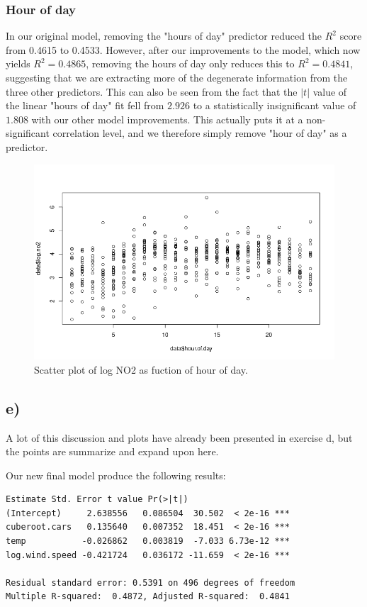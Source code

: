 \documentclass[a4paper, twocolumn]{article}
\begin{document}
\subsubsection*{Hour of day}
In our original model, removing the "hours of day" predictor reduced the $R^2$ score from 0.4615 to 0.4533. However, after our improvements to the model, which now yields $R^2 = 0.4865$, removing the hours of day only reduces this to $R^2 = 0.4841$, suggesting that we are extracting more of the degenerate information from the three other predictors. This can also be seen from the fact that the $|t|$ value of the linear "hours of day" fit fell from $2.926$ to a statistically insignificant value of $1.808$ with our other model improvements. This actually puts it at a non-significant correlation level, and we therefore simply remove "hour of day" as a predictor.


\begin{figure}[h!]
    \centering
    \includegraphics[width=0.7\linewidth]{figures/no2_hour_vs_no2.png}
    \caption{Scatter plot of log NO2 as fuction of hour of day.}
    \label{fig:no2_hour_vs_no2}
\end{figure}


\subsection*{e)}
A lot of this discussion and plots have already been presented in exercise d, but the points are summarize and expand upon here.

Our new final model produce the following results:
\begin{Verbatim}[fontsize=\small]
    Estimate Std. Error t value Pr(>|t|)    
(Intercept)     2.638556   0.086504  30.502  < 2e-16 ***
cuberoot.cars   0.135640   0.007352  18.451  < 2e-16 ***
temp           -0.026862   0.003819  -7.033 6.73e-12 ***
log.wind.speed -0.421724   0.036172 -11.659  < 2e-16 ***

Residual standard error: 0.5391 on 496 degrees of freedom
Multiple R-squared:  0.4872, Adjusted R-squared:  0.4841 
\end{Verbatim}
\end{document}
